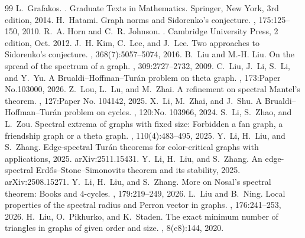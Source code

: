\documentclass[10pt,a4paper]{amsart}
\begin{document}
\begin{thebibliography}{99}
 L.~Grafakos. . \newblock Graduate Texts in Mathematics. Springer, New York, 3rd edition, 2014.
 H.~Hatami. \newblock Graph norms and {Sidorenko}'s conjecture. , 175:125--150, 2010.
 R.~A. Horn and C.~R. Johnson. . \newblock Cambridge University Press, 2 edition, Oct. 2012.
 J.~H. Kim, C.~Lee, and J.~Lee. \newblock Two approaches to {Sidorenko}'s conjecture. , 368(7):5057--5074, 2016.
 B.~Liu and M.-H. Liu. \newblock On the spread of the spectrum of a graph. , 309:2727--2732, 2009.
 C.~Liu, J.~Li, S.~Li, and Y.~Yu. \newblock A {Brualdi--Hoffman--Tur\'{a}n} problem on theta graph. , 173:Paper No.103000, 2026.
 Z.~Lou, L.~Lu, and M.~Zhai. \newblock A refinement on spectral {Mantel's} theorem. , 127:Paper No. 104142, 2025.
 X.~Li, M.~Zhai, and J.~Shu. \newblock A {Brualdi--Hoffman--Tur\'{a}n} problem on cycles. , 120:No. 103966, 2024.
 S.~Li, S.~Zhao, and L.~Zou. \newblock Spectral extrema of graphs with fixed size: {Forbidden} a fan graph, a friendship graph or a theta graph. , 110(4):483–495, 2025.
 Y.~Li, H.~Liu, and S.~Zhang. \newblock Edge-spectral {Tur{\'a}n} theorems for color-critical graphs with applications, 2025. \newblock arXiv:2511.15431.
 Y.~Li, H.~Liu, and S.~Zhang. \newblock An edge-spectral {Erd\H{o}s--Stone--Simonovits} theorem and its stability, 2025. \newblock arXiv:2508.15271.
 Y.~Li, H.~Liu, and S.~Zhang. \newblock More on {Nosal}'s spectral theorem: {Books} and {$4$}-cycles. , 179:219--249, 2026.
 L.~Liu and B.~Ning. \newblock Local properties of the spectral radius and {Perron} vector in graphs. , 176:241--253, 2026.
 H.~Liu, O.~Pikhurko, and K.~Staden. \newblock The exact minimum number of triangles in graphs of given order and size. , 8(e8):144, 2020.

\end{thebibliography}
\end{document}
